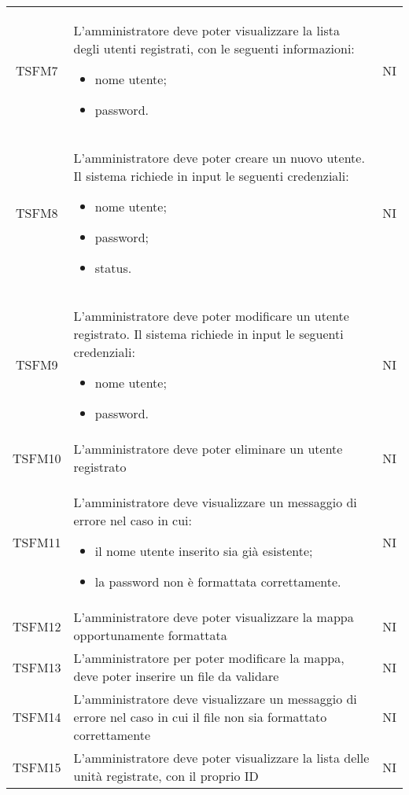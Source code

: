\begin{longtable}[h!] { c  m{12cm} c}
		TSFM7 & L'amministratore deve poter visualizzare la lista degli utenti registrati, con le seguenti informazioni:
					\begin{itemize}
						\item nome utente;
						\item password.
					\end{itemize}
									& NI \\
		TSFM8 & L'amministratore deve poter creare un nuovo utente. Il sistema richiede in input le seguenti credenziali:
					\begin{itemize}
						\item nome utente;
						\item password;
						\item status.
					\end{itemize}
										& NI \\

		TSFM9  & L'amministratore deve poter modificare un utente registrato. Il sistema richiede in input le seguenti credenziali:
					\begin{itemize}
						\item nome utente;
						\item password.
					\end{itemize}
											& NI \\
		TSFM10 & L'amministratore deve poter eliminare un utente registrato & NI \\

		TSFM11 & L'amministratore deve visualizzare un messaggio di errore nel caso in cui:
						\begin{itemize}
						\item il nome utente inserito sia già esistente;
						\item la password non è formattata correttamente.
					\end{itemize}
										& NI \\
		TSFM12   & L'amministratore deve poter visualizzare la mappa opportunamente formattata & NI\\
		
		TSFM13   & L'amministratore per poter modificare la mappa, deve poter inserire un file da validare & NI\\

		TSFM14 & L'amministratore deve visualizzare un messaggio di errore nel caso in cui il file non sia formattato correttamente & NI \\

		TSFM15   & L'amministratore deve poter visualizzare la lista delle unità registrate, con il proprio ID & NI\\


\end{longtable}
